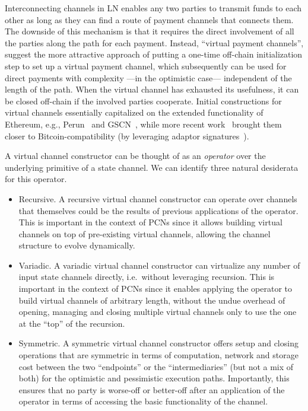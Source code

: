 Interconnecting channels in LN enables any two parties to transmit funds
to each other as long as they can find a route of payment channels that connects
them. The downside of this mechanism is that it requires the direct involvement
of all the parties along the path for each payment. Instead, ``virtual payment
channels'', suggest the more attractive approach of putting a one-time off-chain
initialization step to set up a virtual payment channel, which subsequently can
be used for direct payments with complexity ---in the optimistic case---
independent of the length of the path. When the virtual channel has exhausted
its usefulness, it can be closed off-chain if the involved parties cooperate.
Initial constructions for virtual channels essentially capitalized on the extended functionality of Ethereum, e.g.,
Perun~\cite{perun} and GSCN~\cite{DBLP:conf/ccs/DziembowskiFH18}, while more
recent work~\cite{9519487} brought them closer to
Bitcoin-compatibility (by leveraging adaptor
signatures~\cite{DBLP:journals/iacr/AumayrEEFHMMR20}).

A virtual channel constructor can be thought of as an \emph{operator} over the
underlying primitive of a state channel. We can identify three natural
desiderata for this operator.

\begin{itemize}
\item Recursive. A recursive virtual channel constructor can operate over
channels that themselves could be the results of previous applications of the
operator. This is important in the context of PCNs since it allows building
virtual channels on top of pre-existing virtual channels, allowing the channel
structure to evolve dynamically.
\item Variadic. A variadic virtual channel constructor can virtualize any number
of input state channels directly, i.e.\ without leveraging recursion. This is
important in the context of PCNs since it enables applying the operator to build
virtual channels of arbitrary length, without the undue overhead of opening,
managing and closing multiple virtual channels only to use the one at the
``top'' of the recursion.
\item Symmetric. A symmetric virtual channel constructor offers setup and
closing operations that are symmetric in terms of computation, network and storage cost between the two
``endpoints'' or the ``intermediaries'' (but not a mix of both) for the
optimistic and pessimistic execution paths. Importantly, this ensures that no party is worse-off or better-off after an application of the operator in terms of accessing the basic functionality of the channel.
\end{itemize}


